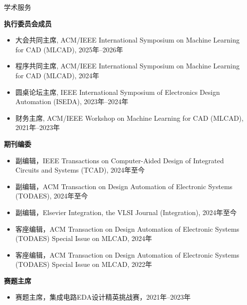
\begin{rSection}{学术服务}

\textbf{执行委员会成员}
\begin{itemize}
    \item 大会共同主席, ACM/IEEE International Symposium on Machine Learning for CAD (MLCAD), 2025年--2026年
    \item 程序共同主席, ACM/IEEE International Symposium on Machine Learning for CAD (MLCAD), 2024年
    \item 圆桌论坛主席, IEEE International Symposium of Electronics Design Automation (ISEDA), 2023年--2024年
    \item 财务主席, ACM/IEEE Workshop on Machine Learning for CAD (MLCAD), 2021年--2023年 
\end{itemize}

\textbf{期刊编委}
\begin{itemize}
    \item 副编辑，IEEE Transactions on Computer-Aided Design of Integrated Circuits and Systems (TCAD), 2024年至今
    \item 副编辑，ACM Transaction on Design Automation of Electronic Systems (TODAES), 2024年至今
    \item 副编辑，Elsevier Integration, the VLSI Journal (Integration), 2024年至今
    \item 客座编辑，ACM Transaction on Design Automation of Electronic Systems (TODAES) Special Issue on MLCAD, 2024年
    \item 客座编辑，ACM Transaction on Design Automation of Electronic Systems (TODAES) Special Issue on MLCAD, 2022年
\end{itemize}

\textbf{赛题主席}
\begin{itemize}
    \item 赛题主席，集成电路EDA设计精英挑战赛，2021年--2023年
\end{itemize}


\end{rSection}
